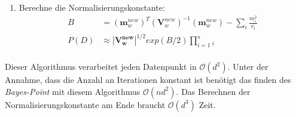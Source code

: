 \documentclass[12pt,a4paper]{scrartcl}
\numberwithin{equation}{section}
\begin{document}
{\begin{enumerate}
\begin{enumerate}
    \begin{equation}
    \begin{split}
     \mathbf{V}_w \mathbf{x}_i &= ( \mathbf{V}_w^{new} \mathbf{x}_i ) \frac{ v_i }{ v_i - \mathbf{x}_i \mathbf{V}_w^{new} \mathbf{x}_i } \\
     \mathbf{x}_i \mathbf{V}_w \mathbf{x}_i &= (\frac{1}{\mathbf{x}_i \mathbf{V}_w^{new} \mathbf{x}_i} - \frac{1}{v_i})^{-1} \\
     \end{split}
    \end{equation}
    \item Berechne mittels ADF $(\mathbf{m}_w^{new}, \mathbf{V}_w^{new}, Z_i)$ aus $(\mathbf{m}_w, \mathbf{V}_w)$ neu.
    \item Aktualisiere $t_i'$: 
    \begin{equation}
     \begin{split}
      v_i &= \mathbf{x}_i^T \mathbf{V}_w \mathbf{x}_i ( \frac{1}{\alpha_i \mathbf{x}_i^T \mathbf{m}_w^{new}} -1 )  \\
      m_i &= \mathbf{x}_i^T \mathbf{m}_w + (v_i + \mathbf{x}_i^{T} \mathbf{V}_w \mathbf{x}_i) \alpha_i \\
      s_i &= Z_i \frac{|\mathbf{V}_i + \mathbf{V}_w|^{1/2}}{|\mathbf{V}_i|^{1/2}} exp(\frac{1}{2}(\mathbf{m}_i \mathbf{m}_w)^T) (\mathbf{V}_i + \mathbf{V}_w)^{-1} (\mathbf{m}_i - \mathbf{m}_w^))\\
      &= Z_i \sqrt{1 + v_i^{-1} \mathbf{x}_i^T \mathbf{V}_w \mathbf{x}_i} exp(\frac{1}{2} \frac{\mathbf{x}_i^T \mathbf{V}_w \mathbf{x}_i}{\mathbf{x}_i^T \mathbf{m}_w^{new}} \alpha_i)\\
      \end{split}
    \end{equation}
   \end{enumerate}
   \item Berechne die Normalisierungskonstante: 
   \begin{equation}
    \begin{split}
      B &= (\mathbf{m}_w^{new})^T (\mathbf{V}_w^{new})^{-1} (\mathbf{m}_w^{new}) - \sum_i \frac{m_i^2}{v_i} \\
      P(D) &\approx |\mathbf{V_w^{new}}|^{1/2} exp(B/2) \prod_{i = 1}^ s_i \\
     \end{split}
   \end{equation}
  \end{enumerate}

  Dieser Algorithmus verarbeitet jeden Datenpunkt in $\mathcal{O}(d^2)$. Unter der Annahme, dass die Anzahl 
  an Iterationen konstant ist benötigt das finden des \textit{Bayes-Point} mit diesem Algorithmus
   $\mathcal{O}(nd^2)$. Das Berechnen der Normalisierungskonstante am Ende braucht  $\mathcal{O}(d^3)$ Zeit. 

}
\end{document}
